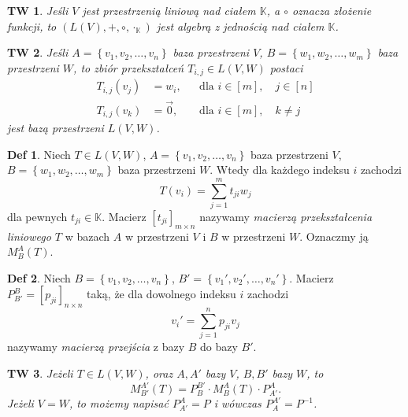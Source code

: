 \documentclass[a4paper, 12pt]{mwart}
\theoremstyle{definition}
\newtheorem{definicja}{Def}[section]
\theoremstyle{plain}
\newtheorem{twierdzenie}{TW}[section]
\theoremstyle{remark}
\begin{document}
\begin{twierdzenie}
	Jeśli $V$ jest przestrzenią liniową nad ciałem $\mathbb{K}$, a $\circ$ oznacza złożenie funkcji, to $\left(L(V), +, \circ, \cdot_\mathbb{K}\right)$ jest algebrą z jednością nad ciałem $\mathbb{K}$.
\end{twierdzenie}
\begin{twierdzenie}
	Jeśli $A = \left\{v_1, v_2, \ldots, v_n\right\}$ \ppauza baza przestrzeni $V$, $B = \left\{w_1, w_2, \ldots, w_m\right\}$ \ppauza baza przestrzeni $W$, to zbiór przekształceń $T_{i,j} \in L(V, W)$ postaci
	\begin{align}
		T_{i,j}(v_j) &= w_i, &&\text{dla } i \in [m], \quad j \in [n] \\
		T_{i,j}(v_k) &= \vec{0}, &&\text{dla } i \in [m], \quad k \neq j
	\end{align}
	jest bazą przestrzeni $L(V, W)$.
\end{twierdzenie}
\begin{definicja}
	Niech $T \in L(V, W)$, $A = \left\{v_1, v_2, \ldots, v_n\right\}$ \ppauza baza przestrzeni $V$, $B = \left\{w_1, w_2, \ldots, w_m\right\}$ \ppauza baza przestrzeni $W$. Wtedy dla każdego indeksu $i$ zachodzi
	\begin{equation}
		T(v_i) = \sum_{j = 1}^m t_{ji}w_j
	\end{equation}
	dla pewnych $t_{ji} \in \mathbb{K}$. Macierz $\left[t_{ji}\right]_{m \times n}$ nazywamy \emph{macierzą przekształcenia liniowego $T$} w bazach $A$ w przestrzeni $V$ i $B$ w przestrzeni $W$. Oznaczmy ją $M_B^A(T)$.
\end{definicja}
\begin{definicja}
	Niech $B = \left\{v_1, v_2, \ldots, v_n \right\}$, $B' = \left\{v_1', v_2', \ldots, v_n' \right\}$. Macierz $P^B_{B'} = [p_{ji}]_{n \times n}$ taką, że dla dowolnego indeksu $i$ zachodzi
	\begin{equation}
		v_i' = \sum_{j = 1}^n p_{ji}v_j
	\end{equation}
	nazywamy \emph{macierzą przejścia} z bazy $B$ do bazy $B'$.
\end{definicja}
\begin{twierdzenie}
	Jeżeli $T \in L(V, W)$, oraz $A, A'$ \ppauza bazy $V$, $B, B'$ \ppauza bazy $W$, to
	\begin{equation}
		 M^{A'}_{B'}(T) = P^{B'}_B \cdot M^A_B(T) \cdot P^A_{A'}.
	\end{equation}
	Jeżeli $V = W$, to możemy napisać $P^A_{A'} = P$ i wówczas $P^{A'}_A = P^{-1}$.
\end{twierdzenie}
\end{document}
